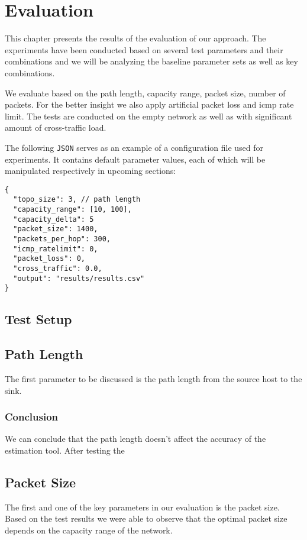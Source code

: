 \chapter{Evaluation}
This chapter presents the results of the evaluation of our approach. The experiments have been conducted based on several test parameters and their combinations and we will be analyzing the baseline parameter sets as well as key combinations. 

We evaluate based on the path length, capacity range, packet size, number of packets. For the better insight we also apply artificial packet loss and icmp rate limit. 
The tests are conducted on the empty network as well as with significant amount of cross-traffic load.

The following \texttt{JSON} serves as an example of a configuration file used for experiments.
It contains default parameter values, each of which will be manipulated respectively in upcoming sections:
\begin{lstlisting}
{    
  "topo_size": 3, // path length
  "capacity_range": [10, 100],			
  "capacity_delta": 5
  "packet_size": 1400,
  "packets_per_hop": 300,
  "icmp_ratelimit": 0,
  "packet_loss": 0,
  "cross_traffic": 0.0,
  "output": "results/results.csv"
}
\end{lstlisting}

\section{Test Setup}

\section{Path Length}
The first parameter to be discussed is the path length from the source host to the sink. 

\subsection*{Conclusion}
We can conclude that the path length doesn't affect the accuracy of the estimation tool. After testing the 

\section{Packet Size}
The first and one of the key parameters in our evaluation is the packet size. 
Based on the test results we were able to observe that the optimal packet size depends on the capacity range of the network. 


